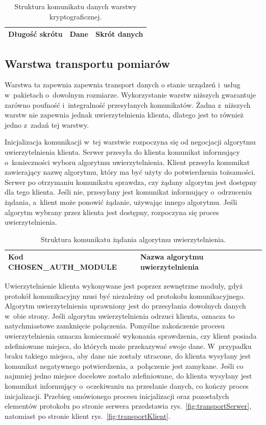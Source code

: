 \begin{table}[H]
\centering
\caption{Struktura komunikatu danych warstwy kryptograficznej. }

\begin{tabular}{|p{3cm}|p{6cm}|p{3cm}|}
\hline
Długość skrótu & Dane & Skrót danych\\
\hline
\end{tabular}
\end{table}

\subsection[Warstwa transportu pomiarów][Warstwa transportu pomiarów]{Warstwa transportu pomiarów}

Warstwa ta zapewnia zapewnia transport danych o stanie urządzeń
i~usług w~pakietach o~dowolnym rozmiarze. Wykorzystanie warstw
niższych gwarantuje zarówno poufność i~integralność przesyłanych
komunikatów. Żadna z~niższych warstw nie zapewnia jednak
uwierzytelnienia klienta, dlatego jest to również jedno z~zadań tej
warstwy.

Inicjalizacja komunikacji w~tej warstwie rozpoczyna się od negocjacji
algorytmu uwierzytelnienia klienta. Serwer przesyła do klienta
komunikat informujący o~konieczności wyboru algorytmu
uwierzytelnienia. Klient przesyła komunikat zawierający nazwę
algorytmu, który ma być użyty do potwierdzenia tożsamości. Serwer po
otrzymaniu komunikatu sprawdza, czy żądany algorytm jest dostępny dla
tego klienta. Jeśli nie, przesyłany jest komunikat informujący
o~odrzuceniu żądania, a~klient może ponowić żądanie, używając innego
algorytmu. Jeśli algorytm wybrany przez klienta jest dostępny,
rozpoczyna się proces uwierzytelnienia.

\begin{table}[H]
\centering
\caption{Struktura komunikatu żądania algorytmu uwierzytelnienia. }
\begin{tabular}{|p{5cm}|p{6cm}|}
\hline
\raggedright{Kod CHOSEN\_AUTH\_MODULE} & Nazwa algorytmu uwierzytelnienia\\
\hline
\end{tabular}
\end{table}

Uwierzytelnienie klienta wykonywane jest poprzez zewnętrzne moduły,
gdyż protokół komunikacyjny musi być niezależny od protokołu
komunikacyjnego. Algorytm uwierzytelnienia uprawniony jest do
przesyłania dowolnych danych w~obie strony. Jeśli algorytm
uwierzytelnienia odrzuci klienta, oznacza to natychmiastowe zamknięcie
połączenia. Pomyślne zakończenie procesu uwierzytelnienia oznacza
konieczność wykonania sprawdzenia, czy klient posiada zdefiniowane
miejsca, do których może przekazywać swoje dane. W~przypadku braku
takiego miejsca, aby dane nie zostały utracone, do klienta wysyłany
jest komunikat negatywnego potwierdzenia, a~połączenie jest
zamykane. Jeśli co najmniej jedno miejsce docelowe zostało
zdefiniowane, do klienta wysyłany jest komunikat informujący
o~oczekiwaniu na przesłanie danych, co kończy proces
inicjalizacji. Przebieg omówionego procesu inicjalizacji oraz
pozostałych elementów protokołu po stronie serwera przedstawia
rys.~\ref{fig:transportSerwer}, natomiast po stronie klient
rys.~\ref{fig:transportKlient}.


